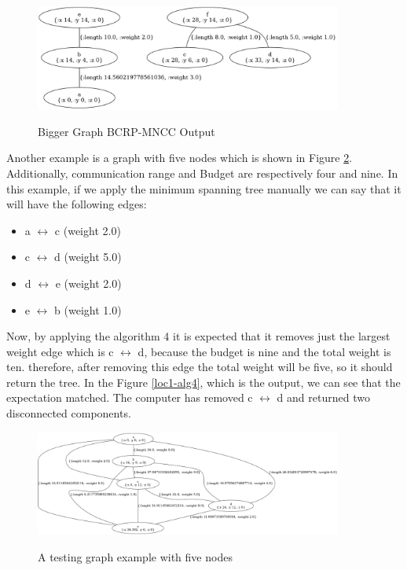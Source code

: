 \documentclass{article}
\begin{document}
\begin{figure}[h]
\centering
\includegraphics[width=0.9\textwidth]{examples/loc3_alg4.png}
\label{loc3_alg4}
\caption{Bigger Graph BCRP-MNCC Output}
\end{figure}

Another example is a graph with five nodes which is shown in Figure \ref{loc1-graph}. Additionally, communication range and Budget are respectively four and nine.  In this example, if we apply the minimum spanning tree manually we can say that it will have the following edges:
\begin{itemize}
    \item a $\longleftrightarrow$ c (weight 2.0)
    \item c $\longleftrightarrow$ d (weight 5.0)
    \item d $\longleftrightarrow$ e (weight 2.0)
    \item e $\longleftrightarrow$ b (weight 1.0)
\end{itemize}
Now, by applying the algorithm 4 it is expected that it removes just the largest weight edge which is c $\longleftrightarrow$ d, because the budget is nine and the total weight is ten. therefore, after removing this edge the total weight will be five, so it should return the tree. In the Figure \ref{loc1-alg4}, which is the output, we can see that the expectation matched. The computer has removed c $\longleftrightarrow$ d and returned two disconnected components.
 
\begin{figure}[h]
\centering
\includegraphics[width=0.9\textwidth]{examples/loc1_graph.png}
\label{loc1-graph}
\caption{A testing graph example with five nodes}
\end{figure}
\end{document}
